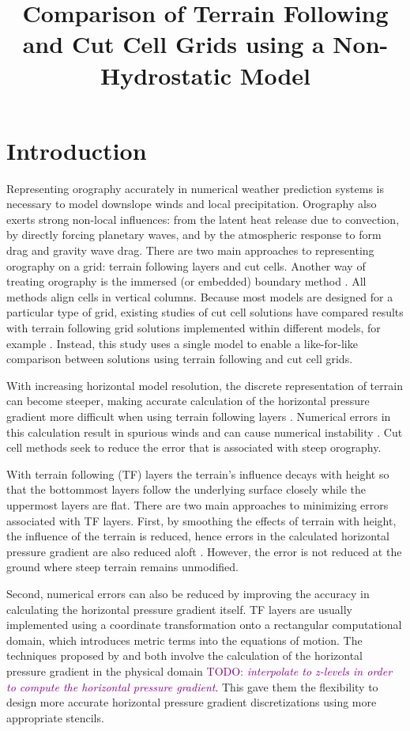 \documentclass{ametsoc}
\title{Comparison of Terrain Following and Cut Cell Grids using a Non-Hydrostatic Model}
\affiliation{Department of Meteorology, University of Reading, Reading, United Kingdom}
\newcommand{\TODO}[1]{\textcolor{purple}{TODO: \emph{#1}}}
\begin{document}
\maketitle

\section{Introduction}
Representing orography accurately in numerical weather prediction systems is necessary to model downslope winds and local precipitation.  Orography also exerts strong non-local influences: from the latent heat release due to convection, by directly forcing planetary waves, and by the atmospheric response to form drag and gravity wave drag.  There are two main approaches to representing orography on a grid: terrain following layers and cut cells.  Another way of treating orography is the immersed (or embedded) boundary method \citep{simon2012}.  All methods align cells in vertical columns.  Because most models are designed for a particular type of grid, existing studies of cut cell solutions have compared results with terrain following grid solutions implemented within different models, for example \citet{good2014}.  Instead, this study uses a single model to enable a like-for-like comparison between solutions using terrain following and cut cell grids.

With increasing horizontal model resolution, the discrete representation of terrain can become steeper, making accurate calculation of the horizontal pressure gradient more difficult when using terrain following layers \citep{gary1973,steppeler2002}.  Numerical errors in this calculation result in spurious winds and can cause numerical instability \citep{fast2003,webster2003}.  Cut cell methods seek to reduce the error that is associated with steep orography.

With terrain following (TF) layers the terrain's influence decays with height so that the bottommost layers follow the underlying surface closely while the uppermost layers are flat.  There are two main approaches to minimizing errors associated with TF layers.  First, by smoothing the effects of terrain with height, the influence of the terrain is reduced, hence errors in the calculated horizontal pressure gradient are also reduced aloft \citep{schaer2002,leuenberger2010,klemp2011}.  However, the error is not reduced at the ground where steep terrain remains unmodified.

Second, numerical errors can also be reduced by improving the accuracy in calculating the horizontal pressure gradient itself.  TF layers are usually implemented using a coordinate transformation onto a rectangular computational domain, which introduces metric terms into the equations of motion.  The techniques proposed by \citet{klemp2011} and \cite{zaengl2012} both involve the calculation of the horizontal pressure gradient in the physical domain \TODO{interpolate to z-levels in order to compute the horizontal pressure gradient}.  This gave them the flexibility to design more accurate horizontal pressure gradient discretizations using more appropriate stencils.
\end{document}
